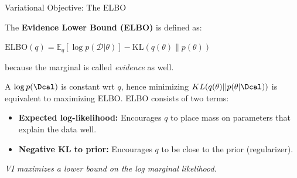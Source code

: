 \documentclass[aspectratio=169,xcolor=dvipsnames,svgnames,x11names,fleqn]{beamer}
\begin{document}
\begin{frame}{Variational Objective: The ELBO}


The \textbf{Evidence Lower Bound (ELBO)} is defined as:
    
    \begin{tcolorbox}
        \centering
        $\text{ELBO}(q) = \mathbb{E}_q[ \log p(\mathcal{D}|\theta)] - \text{KL}(q(\theta) \parallel p(\theta))$
    \end{tcolorbox}

because the marginal is called \textit{evidence} as well.    
    
    
    \begin{small}
   A $\log p (\Dcal)$ is constant wrt $q$, hence minimizing $KL(q(\theta)  || p(\theta|\Dcal)) $ is equivalent to maximizing ELBO. ELBO consists of two terms:
    \begin{itemize}
        \item[\textcolor{DeepBlue}{\tiny $\blacksquare$}] \textbf{Expected log-likelihood:} Encourages $q$ to place mass on parameters that explain the data well.
        \item[\textcolor{DeepBlue}{\tiny $\blacksquare$}] \textbf{Negative KL to prior:} Encourages $q$ to be close to the prior (regularizer).
    \end{itemize}
    \end{small}

    \vspace{0.1cm}
    \centering \footnotesize \color{DeepBlue} \textit{VI maximizes a lower bound on the log marginal likelihood.}

\end{frame}
\end{document}
